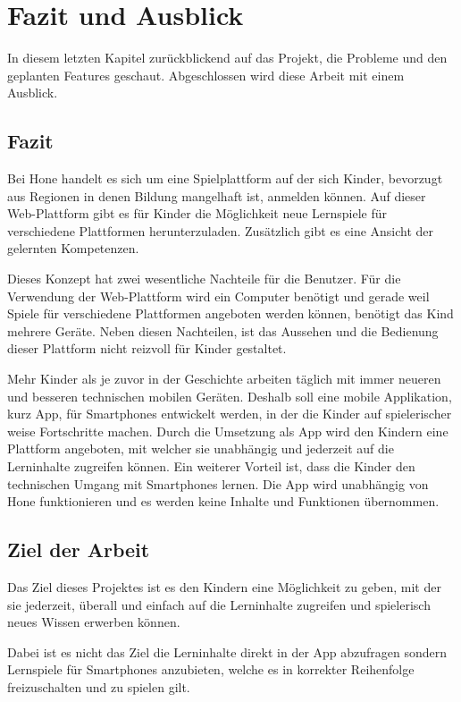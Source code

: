 \chapter{Fazit und Ausblick}
	In diesem letzten Kapitel zurückblickend auf das Projekt, die Probleme und den geplanten Features geschaut. Abgeschlossen wird diese Arbeit mit einem Ausblick. 
	
	\section{Fazit}
	

Bei Hone handelt es sich um eine Spielplattform auf der sich Kinder, bevorzugt aus Regionen in denen Bildung mangelhaft ist, anmelden können. Auf dieser Web-Plattform gibt es für Kinder die Möglichkeit neue Lernspiele für verschiedene Plattformen herunterzuladen. Zusätzlich gibt es eine Ansicht der gelernten Kompetenzen. 

Dieses Konzept hat zwei wesentliche Nachteile für die Benutzer. Für die Verwendung der Web-Plattform wird ein Computer benötigt und gerade weil Spiele für verschiedene Plattformen angeboten werden können, benötigt das Kind mehrere Geräte. Neben diesen Nachteilen, ist das Aussehen und die Bedienung dieser Plattform nicht reizvoll für Kinder gestaltet.

Mehr Kinder als je zuvor in der Geschichte arbeiten täglich mit immer neueren und besseren technischen mobilen Geräten. Deshalb soll eine mobile Applikation, kurz App, für Smartphones entwickelt werden, in der die Kinder auf spielerischer weise Fortschritte machen. Durch die Umsetzung als App wird den Kindern eine Plattform angeboten, mit welcher sie unabhängig und jederzeit auf die Lerninhalte zugreifen können. Ein weiterer Vorteil ist, dass die Kinder den technischen Umgang mit Smartphones lernen. Die App wird unabhängig von Hone funktionieren und es werden keine Inhalte und Funktionen übernommen.

\section{Ziel der Arbeit}

Das Ziel dieses Projektes ist es den Kindern eine Möglichkeit zu geben, mit der sie jederzeit, überall und einfach auf die Lerninhalte zugreifen und spielerisch neues Wissen erwerben können.

Dabei ist es nicht das Ziel die Lerninhalte direkt in der App abzufragen sondern Lernspiele für Smartphones anzubieten, welche es in korrekter Reihenfolge freizuschalten und zu spielen gilt.

